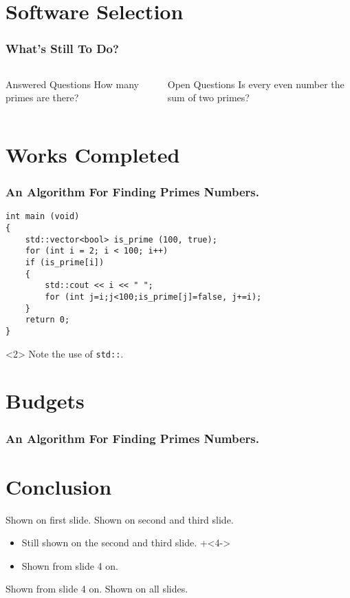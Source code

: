 \documentclass[aspectratio=169]{beamer}
\begin{document}
\section{Software Selection}
\begin{frame}
\frametitle{What’s Still To Do?}
\begin{columns}
\begin{block}{Answered Questions}
How many primes are there?
\end{block}
\begin{block}{Open Questions}
Is every even number the sum of two primes?
\end{block}
\end{columns}
\end{frame}

\section{Works Completed}
\begin{frame}[fragile]
\frametitle{An Algorithm For Finding Primes Numbers.}
\begin{verbatim}
int main (void)
{
    std::vector<bool> is_prime (100, true);
    for (int i = 2; i < 100; i++)
    if (is_prime[i])
    {
        std::cout << i << " ";
        for (int j=i;j<100;is_prime[j]=false, j+=i);
    }
    return 0;
}
\end{verbatim}
\begin{uncoverenv}<2>
Note the use of \verb|std::|.
\end{uncoverenv}
\end{frame}
\section{Budgets}
\begin{frame}[fragile]
\frametitle{An Algorithm For Finding Primes Numbers.}
\begin{semiverbatim}
\end{semiverbatim}
\end{frame}

\section{Conclusion}
\begin{frame}
Shown on first slide.
Shown on second and third slide.
\begin{itemize}
\item
Still shown on the second and third slide.
\onslide+<4->
\item
Shown from slide 4 on.
\end{itemize}
Shown from slide 4 on.
\onslide
Shown on all slides.
\end{frame}
\end{document}
